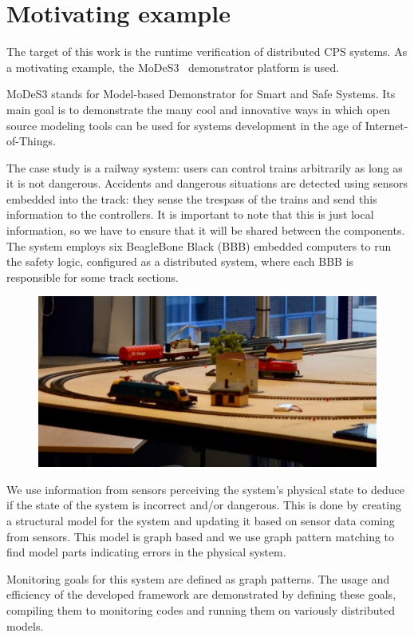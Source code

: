 \chapter{Motivating example}


The target of this work is the runtime verification of distributed CPS systems. As a motivating example, the MoDeS3~\cite{modes3} demonstrator platform is used. 

 MoDeS3 stands for Model-based Demonstrator for Smart and Safe Systems. Its main goal is to demonstrate the many cool and innovative ways in which open source modeling tools can be used for systems development in the age of Internet-of-Things.
 
 The case study is a railway system: users can control trains arbitrarily as long as it is not dangerous. Accidents and dangerous situations are detected using sensors embedded into the track: they sense the trespass of the trains and send this information to the controllers. It is important to note that this is just local information, so we have to ensure that it will be shared between the components. The system employs six BeagleBone Black (BBB) embedded computers to run the safety logic, configured as a distributed system, where each BBB is responsible for some track sections.

\begin{figure}[H]
	\begin{center}
		\includegraphics[width=\textwidth]{figures/modes.png}
	\end{center}
\end{figure}

\pagebreak
We use information from sensors perceiving the system's physical state to deduce if the state of the system is incorrect and/or dangerous. This is done by creating a structural model for the system and updating it based on sensor data coming from sensors. This model is graph based and we use graph pattern matching to find model parts indicating errors in the physical system.

Monitoring goals for this system are defined as graph patterns. The usage and efficiency of the developed framework are demonstrated by defining these goals, compiling them to monitoring codes and running them on variously distributed models. 



